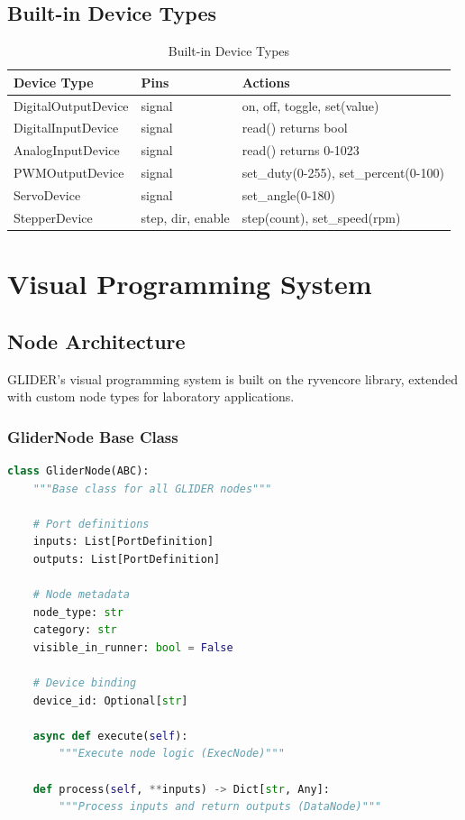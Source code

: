 \documentclass[11pt,a4paper]{article}
\begin{document}
\subsection{Built-in Device Types}

\begin{table}[H]
\centering
\begin{tabular}{@{}llp{7cm}@{}}
\toprule
\textbf{Device Type} & \textbf{Pins} & \textbf{Actions} \\
\midrule
DigitalOutputDevice & signal & on, off, toggle, set(value) \\
DigitalInputDevice & signal & read() returns bool \\
AnalogInputDevice & signal & read() returns 0-1023 \\
PWMOutputDevice & signal & set\_duty(0-255), set\_percent(0-100) \\
ServoDevice & signal & set\_angle(0-180) \\
StepperDevice & step, dir, enable & step(count), set\_speed(rpm) \\
\bottomrule
\end{tabular}
\caption{Built-in Device Types}
\end{table}

\section{Visual Programming System}

\subsection{Node Architecture}

GLIDER's visual programming system is built on the ryvencore library, extended with custom node types for laboratory applications.

\subsubsection{GliderNode Base Class}

\begin{lstlisting}[language=Python]
class GliderNode(ABC):
    """Base class for all GLIDER nodes"""

    # Port definitions
    inputs: List[PortDefinition]
    outputs: List[PortDefinition]

    # Node metadata
    node_type: str
    category: str
    visible_in_runner: bool = False

    # Device binding
    device_id: Optional[str]

    async def execute(self):
        """Execute node logic (ExecNode)"""

    def process(self, **inputs) -> Dict[str, Any]:
        """Process inputs and return outputs (DataNode)"""
\end{lstlisting}
\end{document}

